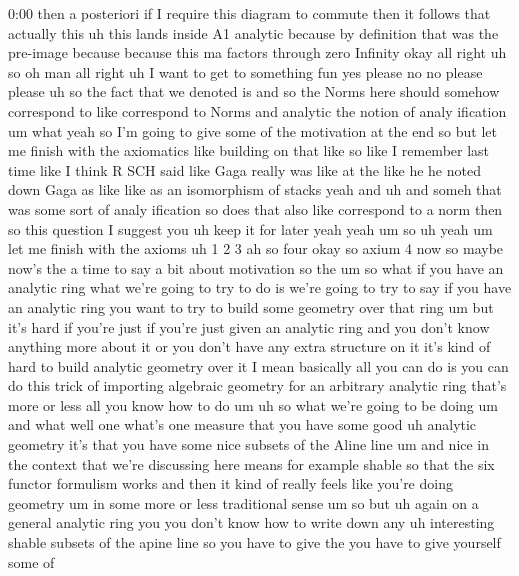 \begin{unfinished}{0:00}
then  a  posteriori  if  I  require  this
diagram  to  commute  then  it  follows  that
actually  this  uh  this  lands  inside  A1
analytic  because  by  definition  that  was
the  pre-image  because  because  this  ma
factors  through  zero
Infinity
okay  all
right
uh  so  oh
man  all  right  uh  I  want  to  get  to
something  fun  yes  please  no  no  please
please
uh  so  the  fact  that  we  denoted  is  and  so
the  Norms  here  should  somehow  correspond
to  like  correspond  to  Norms  and  analytic
the  notion  of  analy  ification  um  what
yeah  so  I'm  going  to  give  some  of  the
motivation  at  the  end  so  but  let  me
finish  with  the  axiomatics  like  building
on  that  like  so  like  I  remember  last
time  like  I  think  R  SCH  said  like  Gaga
really  was  like  at  the  like  he  he  noted
down  Gaga  as  like  like  as  an  isomorphism
of  stacks  yeah  and  uh  and  someh  that  was
some  sort  of  analy  ification  so  does
that  also  like  correspond  to  a  norm  then
so  this  question  I  suggest  you  uh  keep
it  for  later  yeah  yeah  um  so  uh  yeah  um
let  me  finish  with  the  axioms  uh  1  2  3
ah  so
four  okay  so  axium  4  now  so  maybe  now's
the  a  time  to  say  a  bit  about  motivation
so  the  um  so  what  if  you  have  an
analytic  ring  what  we're  going  to  try  to
do  is  we're  going  to  try  to  say  if  you
have  an  analytic  ring  you  want  to  try  to
build  some  geometry  over  that  ring  um
but  it's  hard  if  you're  just  if  you're
just  given  an  analytic  ring  and  you
don't  know  anything  more  about  it  or  you
don't  have  any  extra  structure  on  it
it's  kind  of  hard  to  build  analytic
geometry  over  it  I  mean  basically  all
you  can  do  is  you  can  do  this  trick  of
importing  algebraic  geometry  for  an
arbitrary  analytic  ring  that's  more  or
less  all  you  know  how  to
do
um  uh  so  what  we're  going  to  be
doing  um  and  what  well  one  what's  one
measure  that  you  have  some  good  uh
analytic  geometry  it's  that  you  have
some  nice  subsets  of  the  Aline  line
um  and  nice  in  the  context  that  we're
discussing  here  means  for  example  shable
so  that  the  six  functor  formulism  works
and  then  it  kind  of  really  feels  like
you're  doing  geometry  um  in  some  more  or
less  traditional  sense
um  so  but  uh  again  on  a  general  analytic
ring  you  you  don't  know  how  to  write
down  any  uh  interesting  shable  subsets
of  the  apine  line  so  you  have  to  give
the  you  have  to  give  yourself  some  of

\end{unfinished}
